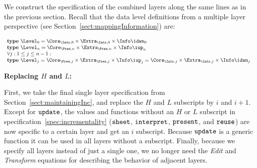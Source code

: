 We construct the specification of the combined layers along the same lines as in the previous section. Recall that the data level definitions from a multiple layer perspective (see Section~\ref{sect:mappingInformation}) are:

\begin{small}\( \begin{array}{lcl}  \label{inv:incrementality}
\text{\bf type}~\Level_{0}  =  \Core_{\Intr,0} \times \Extra_{\Intr,0} \times \Info\idwn_{0} \\
\text{\bf type}~\Level_{n}  =  \Core_{\Pres,n} \times \Extra_{\Pres,n} \times  \Info\iup_{n}\\
\lefteqn{\forall j:1 \le j \le n-1:}  \\
\text{\bf type}~\Level_{j} =  \Core_{\Pres,j} \times \Extra_{\Pres,j}  \times \Info\iup_{j}   
                                       =  \Core_{\Intr,j} \times \Extra_{\Intr,j} \times \Info\idwn_{j}
\end{array}\)\end{small}

\bigskip
{\bf Replacing $H$ and $L$:}

First, we take the  final single layer specification from Section~\ref{sect:maintainingInc}, and replace the $H$ and $L$ subscripts by $i$ and $i+1$. Except for ${\tt update}$, the values and functions without an $H$ or $L$ subscript in specification~\ref{spec:incrementality} (${\tt sheet}$, ${\tt interpret}$, ${\tt present}$, and
 ${\tt reuse}$) are now specific to a certain layer and get an $i$ subscript. Because ${\tt update}$ is a generic function it can be used in all layers without a subscript. Finally, because we specify all layers instead of just a single one, we no longer need the {\em Edit} and {\em Transform} equations for describing the behavior of adjacent layers.

